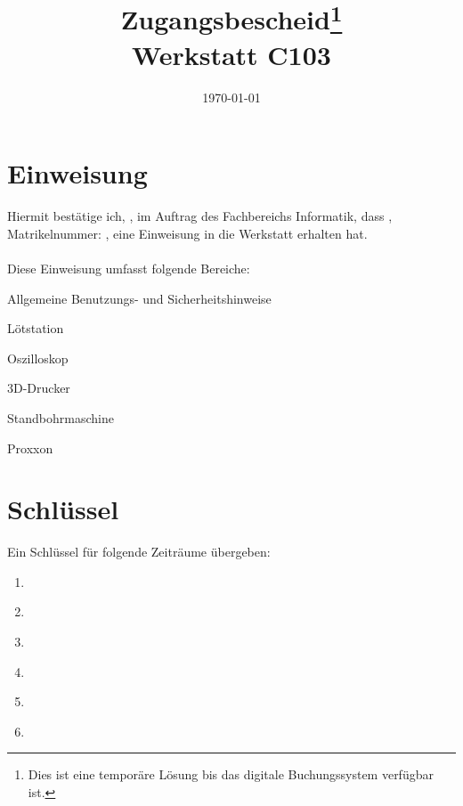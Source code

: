 \documentclass[a4paper]{article}
\begin{document}
\title{\vspace{-3cm}Zugangsbescheid\footnote{Dies ist eine temporäre Lösung bis das digitale Buchungssystem verfügbar ist.} \\
	Werkstatt C103}
\date{\vspace{-1cm}\today{}} %
\maketitle{} %
\section*{Einweisung}
Hiermit bestätige ich, \underline{\hspace{3cm}}, im Auftrag des Fachbereichs Informatik, dass \underline{\hspace{3cm}}, Matrikelnummer: \underline{\hspace{2cm}}, eine Einweisung in die Werkstatt erhalten hat.\\\\
\noindent
Diese Einweisung umfasst folgende Bereiche:
\begin{todolist}
	\item Allgemeine Benutzungs- und Sicherheitshinweise
	\item Lötstation
	\item Oszilloskop
	\item 3D-Drucker
	\item Standbohrmaschine 
	\item Proxxon
\end{todolist}

\section*{Schlüssel}
Ein Schlüssel für folgende Zeiträume übergeben: 
\begin{enumerate}
	\item \underline{\hspace{3cm}}
	\item \underline{\hspace{3cm}}
	\item \underline{\hspace{3cm}}
	\item \underline{\hspace{3cm}}
	\item \underline{\hspace{3cm}}
	\item \underline{\hspace{3cm}}
\end{enumerate}
\noindent
\end{document}
